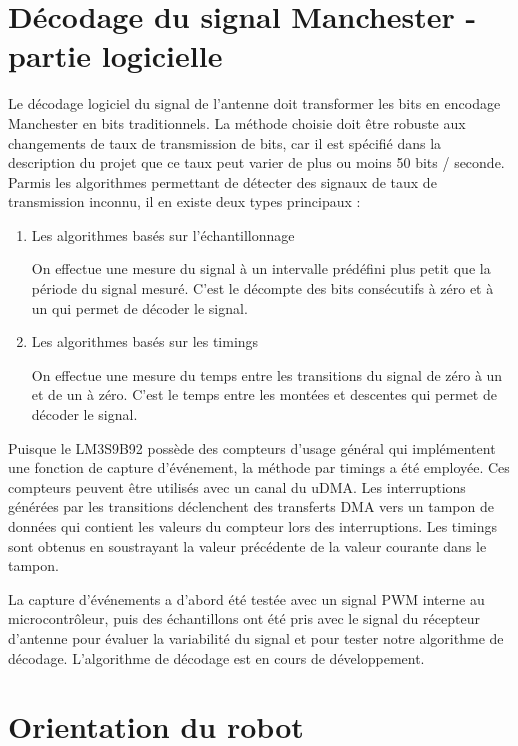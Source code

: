 \section{Décodage du signal Manchester - partie logicielle}

Le décodage logiciel du signal de l'antenne doit transformer les bits en encodage Manchester en bits traditionnels. La méthode choisie doit être robuste aux changements de taux de transmission de bits, car il est spécifié dans la description du projet que ce taux peut varier de plus ou moins 50 bits / seconde. Parmis les algorithmes permettant de détecter des signaux de taux de transmission inconnu, il en existe deux types principaux : 

\begin{enumerate}
\item{Les algorithmes basés sur l'échantillonnage}

On effectue une mesure du signal à un intervalle prédéfini plus petit que la période du signal mesuré. C'est le décompte des bits consécutifs à zéro et à un qui permet de décoder le signal.

\item{Les algorithmes basés sur les timings} 

On effectue une mesure du temps entre les transitions du signal de zéro à un et de un à zéro. C'est le temps entre les montées et descentes qui permet de décoder le signal.
\end{enumerate}

Puisque le LM3S9B92 possède des compteurs d'usage général qui implémentent une fonction de capture d'événement, la méthode par timings a été employée. Ces compteurs peuvent être utilisés avec un canal du uDMA. Les interruptions générées par les transitions déclenchent des transferts DMA vers un tampon de données qui contient les valeurs du compteur lors des interruptions. Les timings sont obtenus en soustrayant la valeur précédente de la valeur courante dans le tampon. 

La capture d'événements a d'abord été testée avec un signal PWM interne au microcontrôleur, puis des échantillons ont été pris avec le signal du récepteur d'antenne pour évaluer la variabilité du signal et pour tester notre algorithme de décodage. L'algorithme de décodage est en cours de développement.

\section{Orientation du robot}

